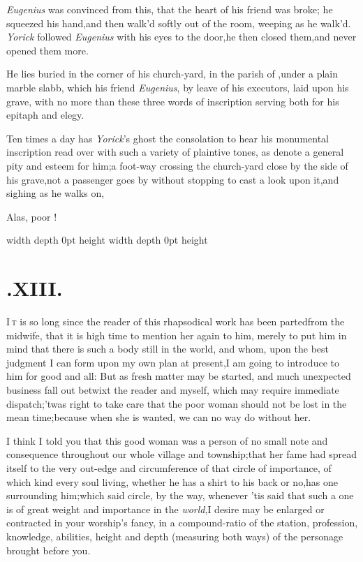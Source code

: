 \documentclass{article}
\begin{document}
\textit{Eugenius} was convinced from this, that the heart of his
friend was broke; he squeezed his hand,\tsh  and then\break
walk’d softly out of the room, weeping as he walk’d. \textit{Yorick}
followed \textit{Eugenius} with his eyes to the door,\tsk  he then
closed them,\tsk and never opened them more.

He lies buried in the corner of his church-yard, in the parish of
\tsh,\break under a plain marble slabb, which his friend
\textit{Eugenius}, by leave of his executors, laid upon his grave, with no more
than these three words of inscription serving both for his epitaph and
elegy.

\vfill
\centerline{}
\vfill

Ten times a day has \textit{Yorick}’s ghost the consolation to hear his
monumental inscription read over with such a variety of plaintive tones, as
denote a general
pity and esteem for him;\tsh  a foot-way crossing the
church-yard close by the side of his grave,\tsk  not a passenger goes by
without stopping to cast a look upon it,\tsh  and sighing as he walks on,

\bigskip
\bigskip
\centerline{Alas, poor !}
\vfill
{}
\newpage \noindent \vrule width \hsize depth 0pt height \vsize
\newpage \noindent \vrule width \hsize depth 0pt height \vsize
\newpage

\section{.\enspace XIII.}

\lettrine{I}{\,t} is so long since the reader of
this rhapsodical work has been parted\break from the midwife, that it is
high time to mention her again to him, merely to put him in mind
that there is such a body still in the world, and whom, upon the
best judgment I can form upon my own plan at present,\tsk I am going to
introduce to him for good and all: But as fresh matter may be
started, and much unexpected business fall out betwixt the reader
and myself, which may require immediate
dispatch;\tsh  ’twas right to take care that the poor
woman should not be lost in the mean time;\tsk  because when she
is wanted, we can no way do without her.\\

I think I told you that this good woman was a person of no small
note and consequence throughout our whole village and
township;\tsk  that her fame had spread itself to the very
out-edge and circumference of that circle of importance, of which
kind every soul living, whether he has a shirt to his back or no,\tsh  has
one surrounding him;\tsk  which said circle, by the way, whenever
’tis said that such a one is of great weight and importance
in the \textit{world},\tsh  I desire may be enlarged or
contracted in your worship’s fancy, in a compound-ratio of
the station, profession, knowledge, abilities, height and depth
(measuring both ways) of the personage brought before you.
\end{document}
